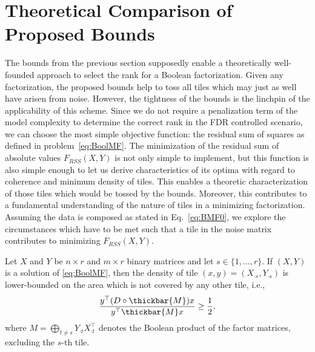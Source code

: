 \section{Theoretical Comparison of Proposed Bounds}\label{sec:theoryCompare}
The bounds from the previous section supposedly enable a theoretically well-founded approach to select the rank for a Boolean factorization. Given any factorization, the proposed bounds help to toss all tiles which may just as well have arisen from noise.
However, the tightness of the bounds is the linchpin of the applicability of this scheme. 
Since we do not require a penalization term of the model complexity to determine the correct rank in the FDR controlled scenario, we can choose the most simple objective function: the residual sum of squares as defined in problem~\eqref{eq:BoolMF}.
The minimization of the residual sum of absolute values $F_{RSS}(X,Y)$ is not only simple to implement, but this function is also simple enough to let us derive characteristics of its optima with regard to coherence and minimum density of tiles. This enables a theoretic characterization of those tiles which would be tossed by the bounds. Moreover, this contributes to a fundamental understanding of the nature of tiles in a minimizing factorization. Assuming the data is composed as stated in Eq.~\eqref{eq:BMF0}, we explore the circumstances which have to be met such that a tile in the noise matrix contributes to minimizing $F_{RSS}(X,Y)$.
\begin{lemma}\label{thm:minDensOverlap}
Let $X$ and $Y$ be $n\times r$ and $m\times r$ binary matrices and let $s\in\{1,\ldots,r\}$. If $(X,Y)$ is a solution of \eqref{eq:BoolMF}, then the density of tile $(x,y)=(X_{\cdot s},Y_{\cdot s})$ is lower-bounded on the area which is  not covered by any other tile, i.e.,
\begin{align}\label{eq:densOverlap}
\frac{y^\top (D\circ \thickbar{M})x}{y^\top \thickbar{M}x}
\geq \frac{1}{2},
\end{align}
where $M =\bigoplus_{t\neq s}Y_{\cdot t}X_{\cdot t}^\top$ denotes the Boolean product of the factor matrices, excluding the $s$-th tile.
\end{lemma}
%
